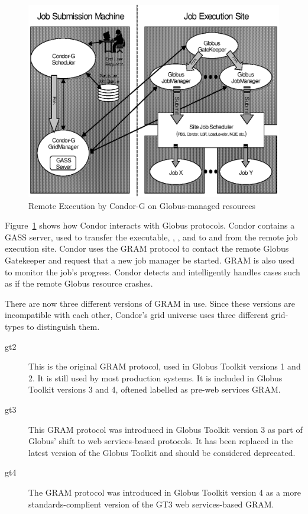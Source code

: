 \begin{figure}[hbt]
\centering
\includegraphics{grids/gfig1.eps}
\caption{\label{fig:condorg}Remote Execution by Condor-G on Globus-managed resources}
\end{figure}

Figure~\ref{fig:condorg} shows how Condor interacts with Globus protocols.
Condor contains a GASS server, used to transfer the executable,
, , and  to and from
the remote job execution site.
Condor uses the GRAM protocol to contact the remote Globus Gatekeeper
and request that a new job manager be started.
GRAM is also used to monitor the job's progress.
Condor detects and intelligently handles cases
such as if the remote Globus resource crashes.

There are now three different versions of GRAM in use. Since these versions
are incompatible with each other, Condor's grid universe uses three different
grid-types to distinguish them.
\begin{description}
\item[gt2]
This is the original GRAM protocol, used in Globus Toolkit versions 1 and 2.
It is still used by most production systems. It is included in Globus
Toolkit versions 3 and 4, oftened labelled as pre-web services GRAM.
\item[gt3]
This GRAM protocol was introduced in Globus Toolkit version 3 as part of
Globus' shift to web services-based protocols. It has been replaced in the
latest version of the Globus Toolkit and should be considered deprecated.
\item[gt4]
The GRAM protocol was introduced in Globus Toolkit version 4 as a more
standards-complient version of the GT3 web services-based GRAM.
\end{description}

